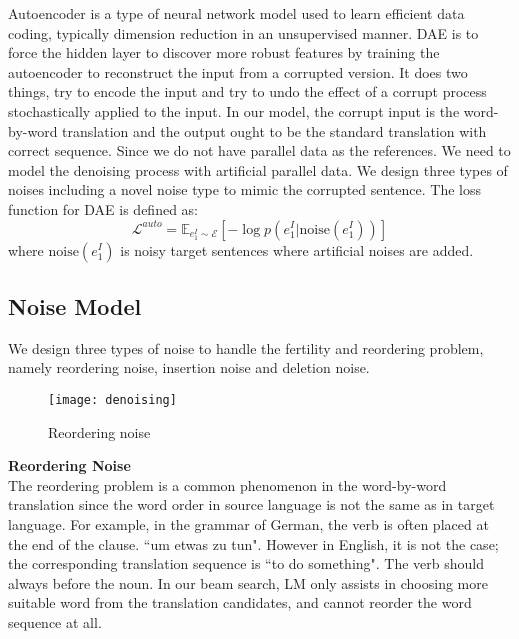	Autoencoder is a type of neural network model used to learn efficient data coding, typically dimension reduction in an unsupervised manner. DAE is to force the hidden layer to discover more robust features by training the autoencoder to reconstruct the input from a corrupted version. It does two things, try to encode the input and try to undo the effect of a corrupt process stochastically applied to the input. In our model, the corrupt input is the word-by-word translation and the output ought to be the standard translation with correct sequence. Since we do not have parallel data as the references. We need to model the denoising process with artificial parallel data. We design three types of noises including a novel noise type to mimic the corrupted sentence. The loss function for DAE is defined as: 
	\[ \mathcal{L}^{auto} = \mathbb{E}_{e_1^I \sim \mathcal{E}}[-\log p(e_1^I| \text{noise}(e_1^I))] \]
	where $\text{noise}(e_1^I)$ is noisy target sentences where artificial noises are added.

	
\subsection{Noise Model}
We design three types of noise to handle the fertility and reordering problem, namely reordering noise, insertion noise and deletion noise. 


	\begin{figure}[h]
	\texttt{[image: denoising]}
	\caption{ Reordering noise}
	\centering
\end{figure}
	\textbf{Reordering Noise}\\

	The reordering problem is a common phenomenon in the word-by-word translation since the word order in source language is not the same as in target language. 
	For example, in  the grammar of German, the verb is often placed at the end of the clause. 
	``um etwas zu tun". However in English, it is not the case; the corresponding translation sequence is ``to do something". The verb should always before the noun.
	In our beam search, LM only assists in choosing  more suitable word from the translation candidates, and cannot reorder the word sequence at all.
	
